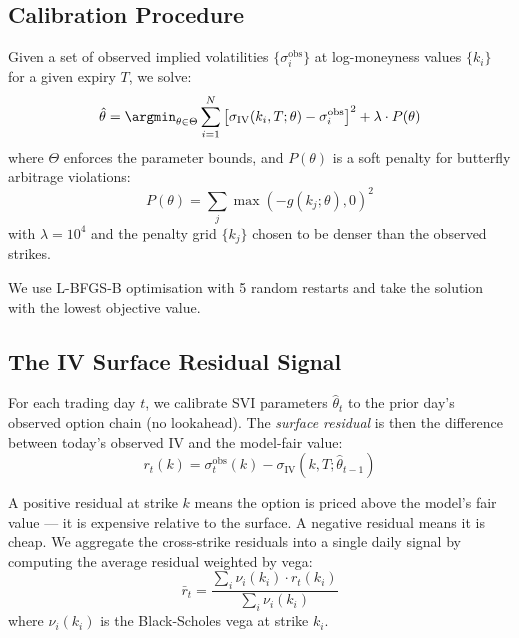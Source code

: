 \documentclass[12pt, letterpaper]{article}
\begin{document}
\subsection{Calibration Procedure}

Given a set of observed implied volatilities $\{\sigma^{\text{obs}}_i\}$ at
log-moneyness values $\{k_i\}$ for a given expiry $T$, we solve:
\begin{equation}
  \hat{\theta} = \argmin_{\theta \in \Theta} \sum_{i=1}^{N}
    \left[\sigma_{\text{IV}}(k_i, T; \theta) - \sigma^{\text{obs}}_i\right]^2
    + \lambda \cdot P(\theta)
  \label{eq:calibration}
\end{equation}
where $\Theta$ enforces the parameter bounds, and $P(\theta)$ is a
soft penalty for butterfly arbitrage violations:
\begin{equation}
  P(\theta) = \sum_{j} \max\left(-g(k_j; \theta), 0\right)^2
  \label{eq:penalty}
\end{equation}
with $\lambda = 10^4$ and the penalty grid $\{k_j\}$ chosen to be denser
than the observed strikes.

We use L-BFGS-B optimisation with 5 random restarts and take the solution
with the lowest objective value.

\subsection{The IV Surface Residual Signal}

For each trading day $t$, we calibrate SVI parameters $\hat{\theta}_t$ to
the prior day's observed option chain (no lookahead). The \emph{surface residual}
is then the difference between today's observed IV and the model-fair value:
\begin{equation}
  r_t(k) = \sigma^{\text{obs}}_t(k) - \sigma_{\text{IV}}(k, T; \hat{\theta}_{t-1})
  \label{eq:residual}
\end{equation}

A positive residual at strike $k$ means the option is priced above the model's
fair value — it is expensive relative to the surface. A negative residual means
it is cheap. We aggregate the cross-strike residuals into a single daily signal
by computing the average residual weighted by vega:
\begin{equation}
  \bar{r}_t = \frac{\sum_i \nu_i(k_i) \cdot r_t(k_i)}{\sum_i \nu_i(k_i)}
  \label{eq:vega_weighted_residual}
\end{equation}
where $\nu_i(k_i)$ is the Black-Scholes vega at strike $k_i$.
\end{document}
